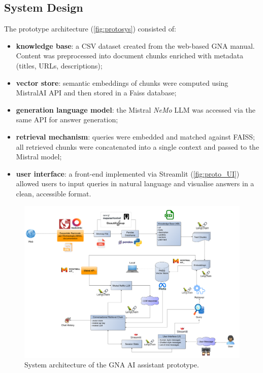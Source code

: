 \begin{spacing}{1.5}
\subsection{System Design}
The prototype architecture (\autoref{fig:protosys}) consisted of:
\begin{itemize}
      \item \textbf{knowledge base}: a CSV dataset created from the web-based GNA manual. Content was preprocessed into document chunks enriched with metadata (titles, URLs, descriptions);
      \item \textbf{vector store}: semantic embeddings of chunks were computed using MistralAI API and then stored in a Faiss database;
      \item \textbf{generation language model}: the Mistral \textit{NeMo} LLM was accessed via the same API for answer generation;
      \item \textbf{retrieval mechanism}: queries were embedded and matched against FAISS; all retrieved chunks were concatenated into a single context and passed to the Mistral model;
      \item \textbf{user interface}: a front-end implemented via Streamlit (\autoref{fig:proto_UI}) allowed users to input queries in natural language and visualise answers in a clean, accessible format.
\end{itemize}


\begin{figure}[H]
  \centering
  \includegraphics[width=\textwidth]{images/prototype_diagram.png} 
  \caption{System architecture of the GNA AI assistant prototype.}
  \label{fig:protosys}
\end{figure}


\end{spacing}
